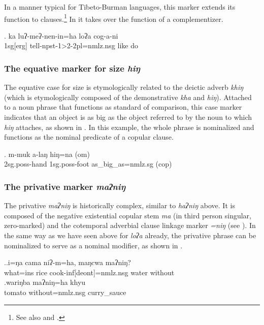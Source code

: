   In a manner typical for Tibeto-Burman languages, this marker extends its function to clauses.\footnote{See also \citet{DeLancey1985_Etymological} and \citet{Genetti1991From}.} In \Next it takes over the function of a complementizer.
  
  \exg. ka luʔ-meʔ-nen-in=ha loʔa  cog-a-ni\\
  {\sc 1sg[erg]}  tell{\sc -npst-1>2-2pl=nmlz.nsg} like do\\
   

  
\subsubsection{The equative  marker for size \emph{hiŋ}}

The equative case for size is etymologically related to the deictic adverb \emph{khiŋ} (which is etymologically composed of the demonstrative \emph{kha} and \emph{hiŋ}). Attached to a noun phrase that functions as standard of comparison, this case marker indicates that an object is as big as the  object referred to by the noun to which \emph{hiŋ} attaches, as shown in \Next. In this example, the whole phrase is nominalized and functions as the nominal predicate of a copular clause.

	\exg. m-muk a-laŋ hiŋ=na (om)\\
 {\sc 2sg.poss-}hand {\sc 1sg.poss-}foot 	as\_big\_as{\sc =nmlz.sg} ({\sc cop})	\\

\subsubsection{The privative marker \emph{maʔniŋ}}

The privative \emph{maʔniŋ} is historically complex, similar to \emph{haʔniŋ} above. It is composed of the negative existential copular stem \emph{ma} (in third person singular, zero-marked) and  the cotemporal adverbial clause linkage marker \emph{=niŋ} (see \Next). In the same way as we have seen above for \emph{loʔa} already, the privative phrase can be nominalized to serve as a nominal modifier, as shown in \Next[b].
  
  \ex.\ag.i=ŋa      cama        niʔ-m=ha,     maŋcwa maʔniŋ?\\
  what{\sc =ins} rice cook{\sc -inf[deont]=nmlz.nsg} water without\\
 
\bg.wariŋba maʔniŋ=ha khyu\\
tomato without{\sc =nmlz.nsg} curry\_sauce\\
  
